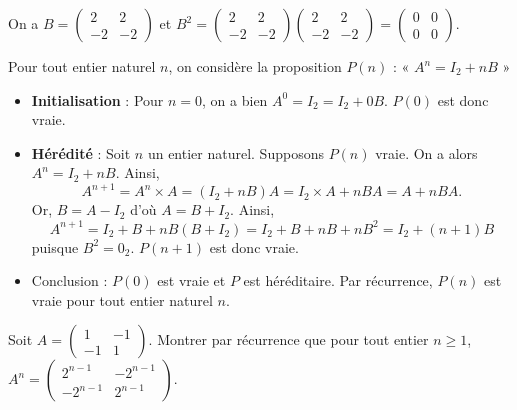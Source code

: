 \documentclass[11pt,fleqn]{book} %
\begin{document}
\begin{solution}On a \(B=\begin{pmatrix}2 & 2 \\ -2 & -2\end{pmatrix}\) et $ B^2 = \begin{pmatrix}2 & 2 \\ -2 & -2\end{pmatrix}\begin{pmatrix}2 & 2 \\ -2 & -2\end{pmatrix} = \begin{pmatrix}0 & 0 \\ 0 &0\end{pmatrix}$.

Pour tout entier naturel \(n\), on considère la proposition \(P(n)\) : « \(A^n = I_2+nB\) »
\begin{itemize}\item \textbf{Initialisation} : Pour \(n=0\), on a bien \(A^0 = I_2 = I_2 + 0B\). \(P(0)\) est donc vraie.
	\item \textbf{Hérédité} : Soit \(n\) un entier naturel. Supposons \(P(n)\) vraie. On a alors \(A^n = I_2+nB\). Ainsi,
		\[A^{n+1}=A^n \times A = (I_2+nB)A = I_2 \times A +nBA = A + nBA.\]
		Or, \(B=A-I_2\) d'où \(A=B+I_2\). Ainsi, 
		\[A^{n+1}=I_2+B+nB(B+I_2)=I_2+B+nB+nB^2=I_2+(n+1)B\]
	puisque \(B^2=0_2\). \(P(n+1)\) est donc vraie.
	\item Conclusion : \(P(0)\) est vraie et \(P\) est héréditaire. Par récurrence, \(P(n)\) est vraie pour tout entier  naturel \(n\).\end{itemize}\end{solution}

\begin{exercise}[topic=mat02]Soit $A=\begin{pmatrix} 1 & -1 \\ -1 & 1\end{pmatrix}$. Montrer par récurrence que pour tout entier $n \geqslant 1$, $A^n = \begin{pmatrix} 2^{n-1} & -2^{n-1} \\ -2^{n-1} & 2^{n-1}\end{pmatrix}$.\end{exercise}
\end{document}
